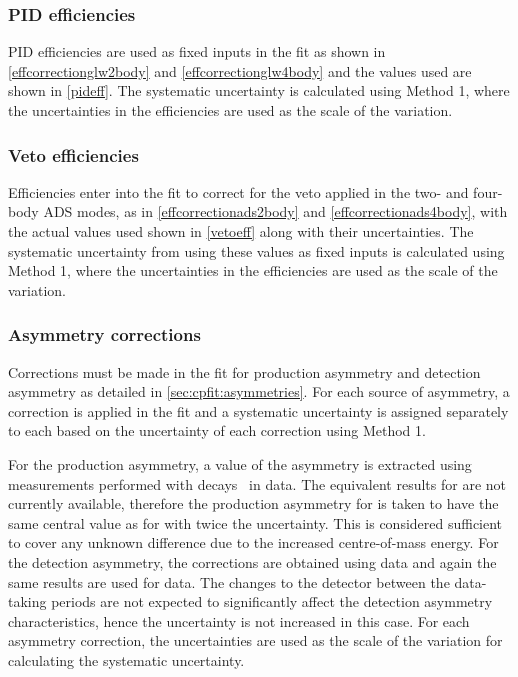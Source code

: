 \subsubsection{PID efficiencies}

PID efficiencies are used as fixed inputs in the \CP fit as shown in \eqns\ref{effcorrectionglw2body} and \ref{effcorrectionglw4body} and the values used are shown in \tab\ref{pideff}. The systematic uncertainty is calculated using Method 1, where the uncertainties in the efficiencies are used as the scale of the variation.

\subsubsection{Veto efficiencies}

Efficiencies enter into the \CP fit to correct for the veto applied in the two- and four-body ADS modes, as in \eqns\ref{effcorrectionads2body} and \ref{effcorrectionads4body}, with the actual values used shown in \tab\ref{vetoeff} along with their uncertainties. The systematic uncertainty from using these values as fixed inputs is calculated using Method 1, where the uncertainties in the efficiencies are used as the scale of the variation.

\subsubsection{Asymmetry corrections}

Corrections must be made in the \CP fit for production asymmetry and detection asymmetry as detailed in \sect\ref{sec:cpfit:asymmetries}. For each source of asymmetry, a correction is applied in the \CP fit and a systematic uncertainty is assigned separately to each based on the uncertainty of each correction using Method 1. 

For the production asymmetry, a \runone value of the asymmetry is extracted using measurements performed with \decay{\Bp}{\Dzb\pip} decays~\cite{LHCb-PAPER-2016-054} in data. The equivalent results for \runtwo are not currently available, therefore the production asymmetry for \runtwo is taken to have the same central value as for \runone with twice the uncertainty. This is considered sufficient to cover any unknown difference due to the increased centre-of-mass energy. For the detection asymmetry, the corrections are obtained using \runone data and again the same results are used for \runtwo data. The changes to the detector between the data-taking periods are not expected to significantly affect the detection asymmetry characteristics, hence the uncertainty is not increased in this case.  For each asymmetry correction, the uncertainties are used as the scale of the variation for calculating the systematic uncertainty.

